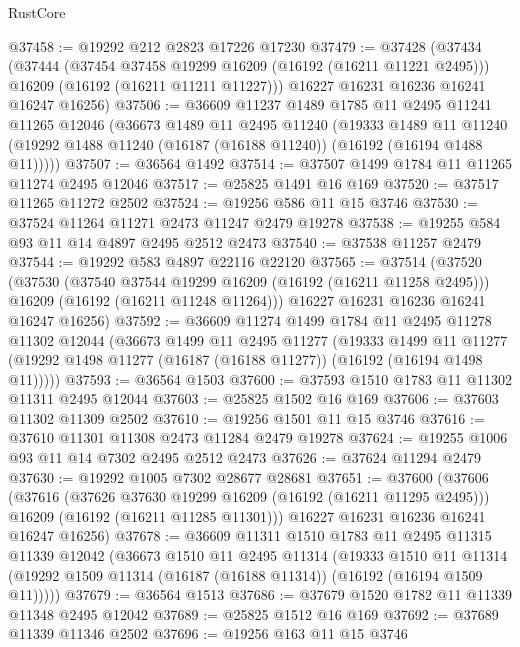 \begin{lexlean}{RustCore}
\begin{coremodule}
@37458 := @19292 @212 @2823 @17226 @17230
@37479 := @37428
    (@37434
      (@37444
        (@37454 @37458 @19299 @16209 (@16192 (@16211 @11221 @2495)))
        @16209
        (@16192 (@16211 @11211 @11227)))
      @16227
      @16231
      @16236
      @16241
      @16247
      @16256)
@37506 := @36609
    @11237
    @1489
    @1785
    @11
    @2495
    @11241
    @11265
    @12046
    (@36673
      @1489
      @11
      @2495
      @11240
      (@19333
        @1489
        @11
        @11240
        (@19292 @1488 @11240 (@16187 (@16188 @11240)) (@16192 (@16194 @1488 @11)))))
@37507 := @36564 @1492
@37514 := @37507 @1499 @1784 @11 @11265 @11274 @2495 @12046
@37517 := @25825 @1491 @16 @169
@37520 := @37517 @11265 @11272 @2502
@37524 := @19256 @586 @11 @15 @3746
@37530 := @37524 @11264 @11271 @2473 @11247 @2479 @19278
@37538 := @19255 @584 @93 @11 @14 @4897 @2495 @2512 @2473
@37540 := @37538 @11257 @2479
@37544 := @19292 @583 @4897 @22116 @22120
@37565 := @37514
    (@37520
      (@37530
        (@37540 @37544 @19299 @16209 (@16192 (@16211 @11258 @2495)))
        @16209
        (@16192 (@16211 @11248 @11264)))
      @16227
      @16231
      @16236
      @16241
      @16247
      @16256)
@37592 := @36609
    @11274
    @1499
    @1784
    @11
    @2495
    @11278
    @11302
    @12044
    (@36673
      @1499
      @11
      @2495
      @11277
      (@19333
        @1499
        @11
        @11277
        (@19292 @1498 @11277 (@16187 (@16188 @11277)) (@16192 (@16194 @1498 @11)))))
@37593 := @36564 @1503
@37600 := @37593 @1510 @1783 @11 @11302 @11311 @2495 @12044
@37603 := @25825 @1502 @16 @169
@37606 := @37603 @11302 @11309 @2502
@37610 := @19256 @1501 @11 @15 @3746
@37616 := @37610 @11301 @11308 @2473 @11284 @2479 @19278
@37624 := @19255 @1006 @93 @11 @14 @7302 @2495 @2512 @2473
@37626 := @37624 @11294 @2479
@37630 := @19292 @1005 @7302 @28677 @28681
@37651 := @37600
    (@37606
      (@37616
        (@37626 @37630 @19299 @16209 (@16192 (@16211 @11295 @2495)))
        @16209
        (@16192 (@16211 @11285 @11301)))
      @16227
      @16231
      @16236
      @16241
      @16247
      @16256)
@37678 := @36609
    @11311
    @1510
    @1783
    @11
    @2495
    @11315
    @11339
    @12042
    (@36673
      @1510
      @11
      @2495
      @11314
      (@19333
        @1510
        @11
        @11314
        (@19292 @1509 @11314 (@16187 (@16188 @11314)) (@16192 (@16194 @1509 @11)))))
@37679 := @36564 @1513
@37686 := @37679 @1520 @1782 @11 @11339 @11348 @2495 @12042
@37689 := @25825 @1512 @16 @169
@37692 := @37689 @11339 @11346 @2502
@37696 := @19256 @163 @11 @15 @3746

\end{coremodule}
\end{lexlean}
